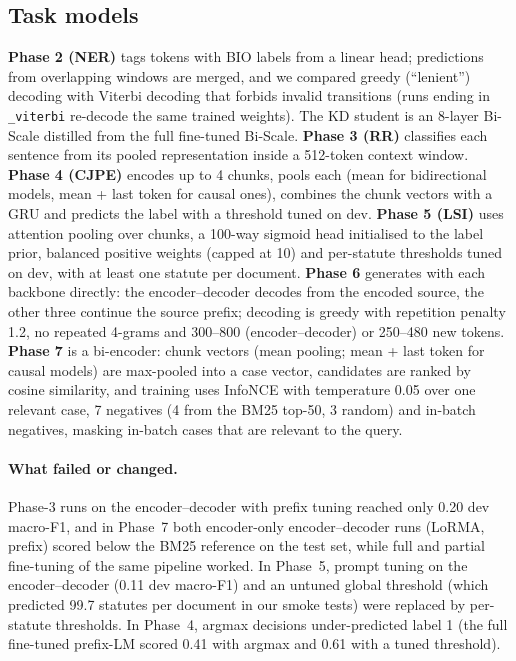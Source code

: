 \documentclass[11pt]{article}
\begin{document}
\subsection{Task models}
\textbf{Phase 2 (NER)} tags tokens with BIO labels from a linear head; predictions from overlapping windows are merged, and we compared greedy (``lenient'') decoding with Viterbi decoding that forbids invalid transitions (runs ending in \texttt{\_viterbi} re-decode the same trained weights). The KD student is an 8-layer Bi-Scale distilled from the full fine-tuned Bi-Scale. \textbf{Phase 3 (RR)} classifies each sentence from its pooled representation inside a 512-token context window. \textbf{Phase 4 (CJPE)} encodes up to 4 chunks, pools each (mean for bidirectional models, mean + last token for causal ones), combines the chunk vectors with a GRU and predicts the label with a threshold tuned on dev. \textbf{Phase 5 (LSI)} uses attention pooling over chunks, a 100-way sigmoid head initialised to the label prior, balanced positive weights (capped at 10) and per-statute thresholds tuned on dev, with at least one statute per document. \textbf{Phase 6} generates with each backbone directly: the encoder--decoder decodes from the encoded source, the other three continue the source prefix; decoding is greedy with repetition penalty 1.2, no repeated 4-grams and 300--800 (encoder--decoder) or 250--480 new tokens. \textbf{Phase 7} is a bi-encoder: chunk vectors (mean pooling; mean + last token for causal models) are max-pooled into a case vector, candidates are ranked by cosine similarity, and training uses InfoNCE \cite{oord2018cpc,karpukhin2020dpr} with temperature 0.05 over one relevant case, 7 negatives (4 from the BM25 top-50, 3 random) and in-batch negatives, masking in-batch cases that are relevant to the query.

\paragraph{What failed or changed.} Phase-3 runs on the encoder--decoder with prefix tuning reached only 0.20 dev macro-F1, and in Phase~7 both encoder-only encoder--decoder runs (LoRMA, prefix) scored below the BM25 reference on the test set, while full and partial fine-tuning of the same pipeline worked. In Phase~5, prompt tuning on the encoder--decoder (0.11 dev macro-F1) and an untuned global threshold (which predicted 99.7 statutes per document in our smoke tests) were replaced by per-statute thresholds. In Phase~4, argmax decisions under-predicted label 1 (the full fine-tuned prefix-LM scored 0.41 with argmax and 0.61 with a tuned threshold).
\end{document}
